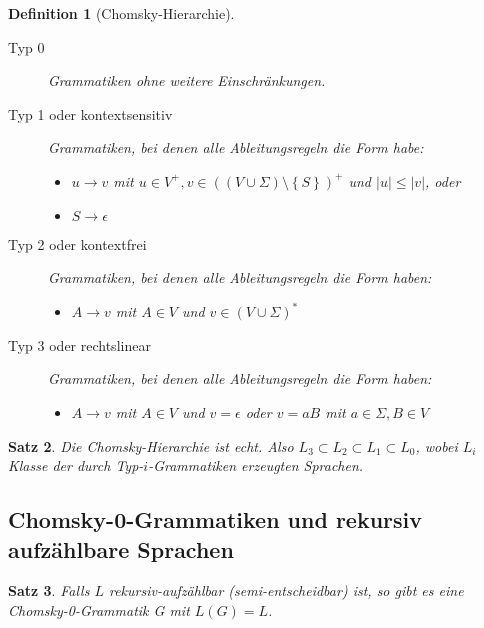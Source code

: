 \documentclass[11pt]{article}
\newcommand{\set}[1]{\left\lbrace #1\right\rbrace}
\theoremstyle{break}
\newtheorem{satz}{Satz}[section]
\newtheorem{defi}[satz]{Definition}
\begin{document}
    \begin{defi}[Chomsky-Hierarchie]
        \begin{description}
            \item[Typ 0] Grammatiken ohne weitere Einschränkungen.
            \item[Typ 1 oder kontextsensitiv] Grammatiken, bei denen alle Ableitungsregeln die Form habe:
            \begin{itemize}
                \item $u\rightarrow v$ mit $u\in V^+,v\in((V\cup\Sigma)\setminus\set{S})^+$ und $|u|\leq |v|$, oder
                \item $S\rightarrow\epsilon$
            \end{itemize}
            \item[Typ 2 oder kontextfrei] Grammatiken, bei denen alle Ableitungsregeln die Form haben:
            \begin{itemize}
                \item $A\rightarrow v$ mit $A\in V$ und $v\in(V\cup\Sigma)^*$
            \end{itemize}
            \item[Typ 3 oder rechtslinear] Grammatiken, bei denen alle Ableitungsregeln die Form haben:
            \begin{itemize}
                \item $A\rightarrow v$ mit $A\in V$ und $v=\epsilon$ oder $v=aB$ mit $a\in\Sigma,B\in V$
            \end{itemize}
        \end{description}
    \end{defi}

    \begin{satz}
        Die Chomsky-Hierarchie ist echt.
        Also $L_3\subset L_2\subset L_1\subset L_0$, wobei $L_i$ Klasse der durch Typ-$i$-Grammatiken erzeugten Sprachen.
    \end{satz}


    \subsection{Chomsky-0-Grammatiken und rekursiv aufzählbare Sprachen}
	\label{subsec:chomsky-0-grammatiken-und-rekursiv-aufzählbare-sprachen}

    \begin{satz}
        Falls $L$ rekursiv-aufzählbar (semi-entscheidbar) ist, so gibt es eine Chomsky-0-Grammatik G mit $L(G)=L$.
    \end{satz}
\end{document}
